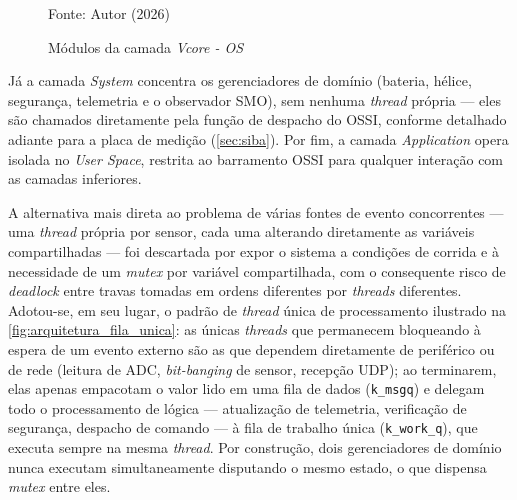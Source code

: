 \begin{figure}[H]
    \centering
    \caption{Módulos da camada \textit{Vcore - OS}}
    \label{fig:Metodologia_Vcore}

    Fonte: Autor (2026)
\end{figure}

Já a camada \textit{System} concentra os gerenciadores de domínio (bateria,
hélice, segurança, telemetria e o observador SMO), sem
nenhuma \textit{thread} própria --- eles são chamados diretamente pela função
de despacho do OSSI, conforme detalhado adiante para a placa de medição
(\autoref{sec:siba}). Por fim, a camada
\textit{Application} opera isolada no \textit{User Space}, restrita ao
barramento OSSI para qualquer interação com as camadas inferiores.

A alternativa mais direta ao problema de várias fontes de evento concorrentes
--- uma \textit{thread} própria por sensor, cada uma alterando diretamente as
variáveis compartilhadas --- foi descartada por expor o sistema a condições de
corrida e à necessidade de um \textit{mutex} por variável compartilhada, com o
consequente risco de \textit{deadlock} entre travas tomadas em ordens
diferentes por \textit{threads} diferentes. Adotou-se, em seu lugar, o padrão
de \textit{thread} única de processamento ilustrado na
\autoref{fig:arquitetura_fila_unica}: as únicas \textit{threads} que
permanecem bloqueando à espera de um evento externo são as que dependem
diretamente de periférico ou de rede (leitura de ADC, \textit{bit-banging} de
sensor, recepção UDP); ao terminarem, elas apenas empacotam o valor lido em
uma fila de dados (\texttt{k\_msgq}) e delegam todo o processamento de lógica
--- atualização de telemetria, verificação de segurança, despacho de comando
--- à fila de trabalho única (\texttt{k\_work\_q}), que executa sempre na
mesma \textit{thread}. Por construção, dois gerenciadores de domínio nunca
executam simultaneamente disputando o mesmo estado, o que dispensa \textit{mutex} entre
eles.

